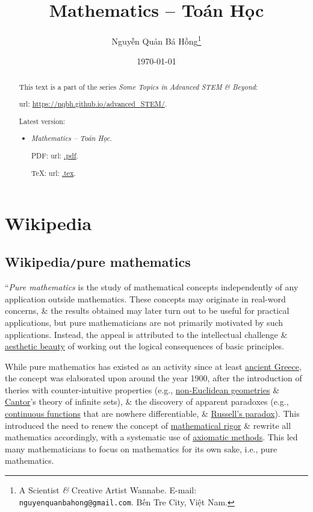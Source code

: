 \documentclass{article}
\title{Mathematics -- Toán Học}
\author{Nguyễn Quản Bá Hồng\footnote{A Scientist {\it\&} Creative Artist Wannabe. E-mail: {\tt nguyenquanbahong@gmail.com}. Bến Tre City, Việt Nam.}}
\date{\today}
\begin{document}
\maketitle
\begin{abstract}
	This text is a part of the series {\it Some Topics in Advanced STEM \& Beyond}:
	
	{\sc url}: \url{https://nqbh.github.io/advanced_STEM/}.
	
	Latest version:
	\begin{itemize}
		\item {\it Mathematics -- Toán Học}.
		
		PDF: {\sc url}: \url{.pdf}.
		
		\TeX: {\sc url}: \url{.tex}.
	\end{itemize}
\end{abstract}
\tableofcontents


\section{Wikipedia}

\subsection{Wikipedia{\tt/}pure mathematics}
``{\it Pure mathematics} is the study of mathematical concepts independently of any application outside mathematics. These concepts may originate in real-word concerns, \& the results obtained may later turn out to be useful for practical applications, but pure mathematicians are not primarily motivated by such applications. Instead, the appeal is attributed to the intellectual challenge \& \href{https://en.wikipedia.org/wiki/Mathematical_beauty}{aesthetic beauty} of working out the logical consequences of basic principles.

While pure mathematics has existed as an activity since at least \href{https://en.wikipedia.org/wiki/Ancient_Greece}{ancient Greece}, the concept was elaborated upon around the year 1900, after the introduction of theries with counter-intuitive properties (e.g., \href{https://en.wikipedia.org/wiki/Non-Euclidean_geometries}{non-Euclidean geometries} \& \href{https://en.wikipedia.org/wiki/Georg_Cantor}{\sc Cantor}'s theory of infinite sets), \& the discovery of apparent paradoxes (e.g., \href{https://en.wikipedia.org/wiki/Continuous_function}{continuous functions} that are nowhere differentiable, \& \href{https://en.wikipedia.org/wiki/Russell%27s_paradox}{Russell's paradox}). This introduced the need to renew the concept of \href{https://en.wikipedia.org/wiki/Mathematical_rigor}{mathematical rigor} \& rewrite all mathematics accordingly, with a systematic use of \href{https://en.wikipedia.org/wiki/Axiomatic_method}{axiomatic methods}. This led many mathematicians to focus on mathematics for its own sake, i.e., pure mathematics.
\end{document}
